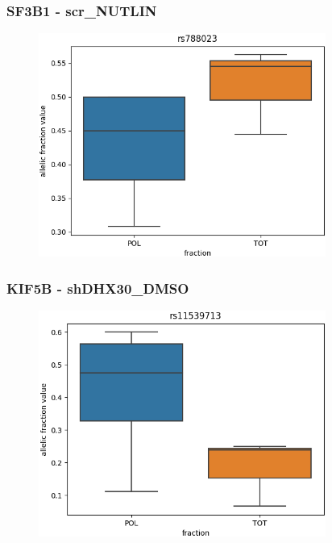 \documentclass{beamer}
\begin{document}
	\begin{frame}
		\frametitle{SF3B1 - scr\_NUTLIN}
		\begin{figure}
			\includegraphics[width=0.84\textwidth]{media/scr_NUTLIN_rs788023.png}
		\end{figure}
	\end{frame}
	\begin{frame}
		\frametitle{KIF5B - shDHX30\_DMSO}
		\begin{figure}
			\includegraphics[width=0.84\textwidth]{media/shDHX30_DMSO_rs11539713.png}
		\end{figure}
	\end{frame}
\end{document}
